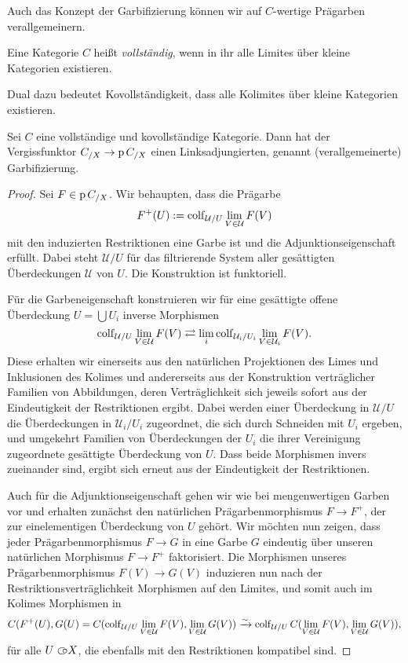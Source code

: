 Auch das Konzept der Garbifizierung können wir auf $C$-wertige
Prägarben verallgemeinern.
\begin{defn}
  Eine Kategorie $C$ heißt \emph{vollständig}, wenn in ihr alle
  Limites über kleine Kategorien existieren.
\end{defn}
Dual dazu bedeutet Kovollständigkeit, dass alle Kolimites über kleine
Kategorien existieren.
\begin{satz}
  Sei $C$ eine vollständige und kovollständige Kategorie. Dann hat der
  Vergissfunktor $C_{/X} \to \operatorname{p} C_{/X}$ einen Linksadjungierten,
  genannt (verallgemeinerte) Garbifizierung.
\end{satz}
\begin{proof}
  Sei $F \in \operatorname{p} C_{/X}$. Wir behaupten, dass die Prägarbe
  \[ F^+(U) :=   \operatorname{colf}_{\mathcal{U}/U} \lim_{V \in \mathcal{U}} F(V) \]
  mit den induzierten Restriktionen eine Garbe ist und die
  Adjunktionseigenschaft erfüllt. Dabei steht $\mathcal{U}/U$ für das
  filtrierende System aller gesättigten Überdeckungen $\mathcal{U}$
  von $U$. Die Konstruktion ist funktoriell.

  Für die Garbeneigenschaft konstruieren wir für eine gesättigte
  offene Überdeckung $U = \bigcup U_i$ inverse Morphismen
  \[ \operatorname{colf}\limits_{\mathcal{U}/U} \lim_{V \in \mathcal{U}} F(V)
  \rightleftarrows
  \lim_i \operatorname{colf}\limits_{\mathcal{U}_i/U_i} \lim_{V \in \mathcal{U}_i} F(V). \]
  Diese erhalten wir einerseits aus den natürlichen Projektionen des
  Limes und Inklusionen des Kolimes und andererseits aus der
  Konstruktion verträglicher Familien von Abbildungen, deren
  Verträglichkeit sich jeweils sofort aus der Eindeutigkeit der
  Restriktionen ergibt. Dabei werden einer Überdeckung in
  $\mathcal{U}/U$ die Überdeckungen in $\mathcal{U}_i/U_i$ zugeordnet,
  die sich durch Schneiden mit $U_i$ ergeben, und umgekehrt Familien
  von Überdeckungen der $U_i$ die ihrer Vereinigung zugeordnete
  gesättigte Überdeckung von $U$. Dass beide Morphismen invers
  zueinander sind, ergibt sich erneut aus der Eindeutigkeit der
  Restriktionen.

  Auch für die Adjunktionseigenschaft gehen wir wie bei mengenwertigen
  Garben vor und erhalten zunächst den natürlichen Prägarbenmorphismus
  $F \to F^+$, der zur einelementigen Überdeckung von $U$ gehört. Wir
  möchten nun zeigen, dass jeder Prägarbenmorphismus $F \to G$ in eine
  Garbe $G$ eindeutig über unseren natürlichen Morphismus $F \to F^+$
  faktorisiert. Die Morphismen unseres Prägarbenmorphismus $F(V) \to
  G(V)$ induzieren nun nach der Restriktionsverträglichkeit Morphismen
  auf den Limites, und somit auch im Kolimes Morphismen in
  \[ C(F^+(U), G(U) =
     C(\operatorname{colf}\limits_{\mathcal{U}/U} \lim_{V \in \mathcal{U}} F(V),
     \lim_{V \in \mathcal{U}} G(V)) \xrightarrow[]{\sim}
     \operatorname{colf}\limits_{\mathcal{U}/U}
     C(\lim_{V \in \mathcal{U}} F(V), \lim_{V \in \mathcal{U}} G(V)), \]
  für alle $U \subset\kern-0.58em\circ X$, die ebenfalls mit den Restriktionen kompatibel
  sind.


\end{proof}
